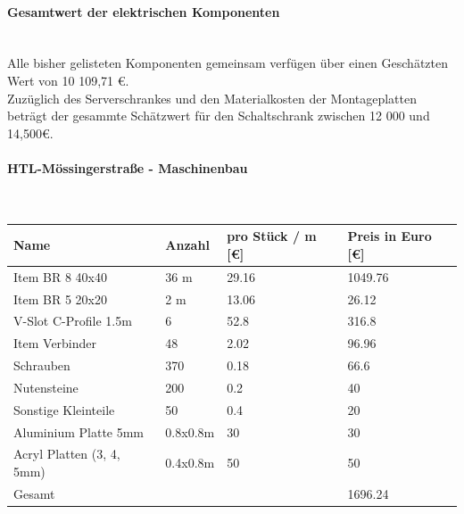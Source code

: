 \paragraph{Gesamtwert der elektrischen Komponenten}\mbox{}\\
    Alle bisher gelisteten Komponenten gemeinsam verfügen über einen Geschätzten Wert von 10 109,71 €.\\ 
    Zuzüglich des Serverschrankes und den Materialkosten der Montageplatten beträgt der gesammte Schätzwert für den Schaltschrank zwischen 12 000 und 14,500€.


\paragraph{HTL-Mössingerstraße - Maschinenbau}\mbox{}\\
    \begin{table}[H]
        \begin{tabular}{llll}
        Name                    & Anzahl   & pro Stück / m {[}€{]} & Preis in Euro {[}€{]} \\ \hline
        Item BR 8 40x40         & 36 m       & 29.16                   & 1049.76               \\
        Item BR 5 20x20         & 2 m        & 13.06                   & 26.12                 \\
        V-Slot C-Profile 1.5m   & 6        & 52.8                    & 316.8                 \\
        Item Verbinder          & 48       & 2.02                    & 96.96                 \\
        Schrauben               & 370      & 0.18                    & 66.6                  \\
        Nutensteine             & 200      & 0.2                     & 40                    \\
        Sonstige Kleinteile     & 50       & 0.4                     & 20                    \\
        Aluminium Platte 5mm    & 0.8x0.8m & 30                      & 30                    \\
        Acryl Platten (3, 4, 5mm) & 0.4x0.8m & 50                      & 50                    \\ \hline
        Gesamt                   &          &                         & 1696.24              
        \end{tabular}
        \end{table}


